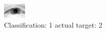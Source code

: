 \begin{figure}[h!]
\begin{center}
\includegraphics[width=0.60\columnwidth]{figures/ID2305_class_1_target_2.png}
\end{center}
\caption{ Classification: 1 actual target: 2}
\label{fig:ID2305_class_1_target_2}
\end{figure}
